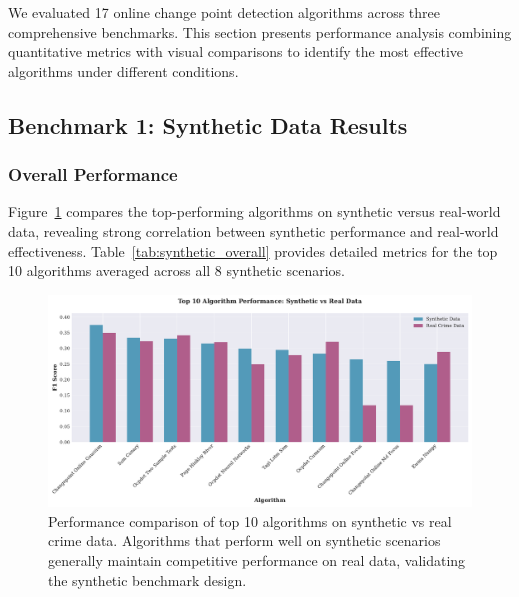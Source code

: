 \documentclass[journal,article,submit,pdftex,moreauthors]{Definitions/mdpi}
\begin{document}
We evaluated 17 online change point detection algorithms across three comprehensive benchmarks. This section presents performance analysis combining quantitative metrics with visual comparisons to identify the most effective algorithms under different conditions.

\subsection{Benchmark 1: Synthetic Data Results}
\label{sec:results_synthetic}

\subsubsection{Overall Performance}

Figure~\ref{fig:top_algorithms} compares the top-performing algorithms on synthetic versus real-world data, revealing strong correlation between synthetic performance and real-world effectiveness. Table~\ref{tab:synthetic_overall} provides detailed metrics for the top 10 algorithms averaged across all 8 synthetic scenarios.

\begin{figure}[ht]
\centering
\includegraphics[width=\textwidth]{figures/fig_top_algorithms_comparison.pdf}
\caption{Performance comparison of top 10 algorithms on synthetic vs real crime data. Algorithms that perform well on synthetic scenarios generally maintain competitive performance on real data, validating the synthetic benchmark design.}
\label{fig:top_algorithms}
\end{figure}
\end{document}
